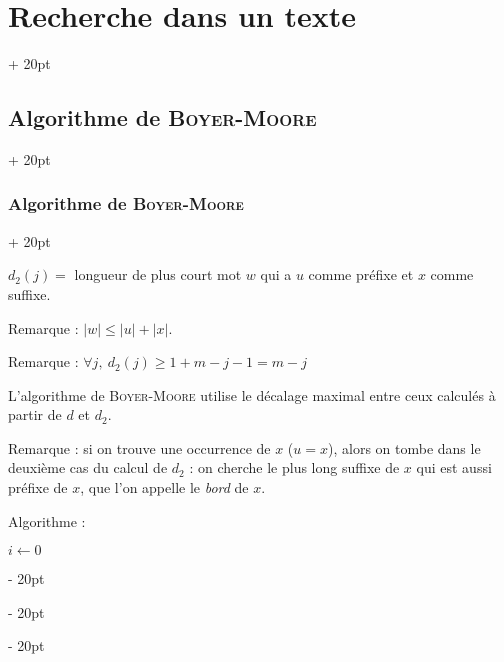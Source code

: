\documentclass[a4paper, 12pt, twoside]{article}
\newcommand{\abs}[1]{\left\lvert #1 \right\rvert}
\renewcommand{\le}{\leqslant}
\renewcommand{\ge}{\geqslant}
\newcommand{\ind}[1][20pt]{\advance\leftskip + #1}
\newcommand{\deind}[1][20pt]{\advance\leftskip - #1}
\newenvironment{indt}[2][20pt]{#2 \par \ind[#1]}{\par \deind} %
\begin{document}
\begin{indt}{\section{Recherche dans un texte}}
\begin{indt}{\subsection{Algorithme de \textsc{Boyer-Moore}}}
\begin{indt}{\subsubsection{Algorithme de \textsc{Boyer-Moore}}}
\begin{center}
                \end{center}

                $d_2(j) =$ longueur de plus court mot $w$ qui a $u$ comme préfixe et $x$ comme suffixe.

                Remarque : $\abs w \le \abs u + \abs x$.

                Remarque : $\forall j,\ d_2(j) \ge 1 + m - j - 1 = m - j$

                \vspace{12pt}
                
                L'algorithme de \textsc{Boyer-Moore} utilise le décalage maximal entre ceux calculés à partir de $d$ et $d_2$.

                Remarque : si on trouve une occurrence de $x$ ($u = x$), alors on tombe dans le deuxième cas du calcul de $d_2$ : on cherche le plus long suffixe de $x$ qui est aussi préfixe de $x$, que l'on appelle le \textit{bord} de $x$.

                Algorithme :

                \begin{pseudocode}
                    $i \leftarrow 0$


\end{pseudocode}
\end{indt}
\end{indt}
\end{indt}
\end{document}
